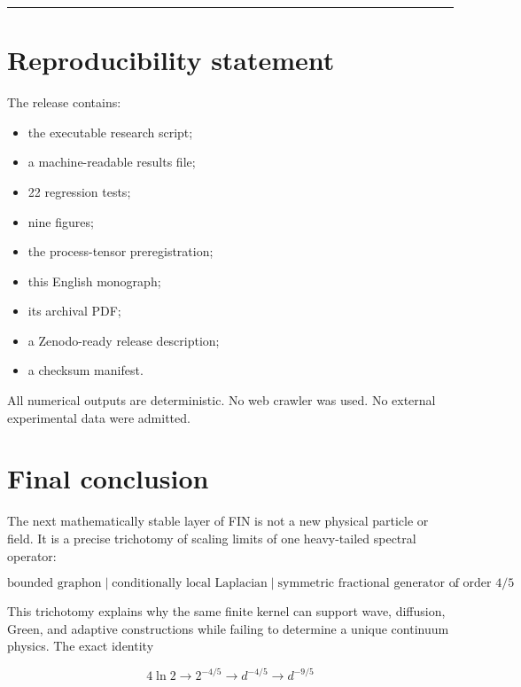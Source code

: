 \documentclass[11pt,a4paper,openany]{report}
\begin{document}
\par\medskip\hrule\medskip

\chapter{Reproducibility statement}

The release contains:

\begin{itemize}
\item 
the executable research script;

\item 
a machine-readable results file;

\item 
22 regression tests;

\item 
nine figures;

\item 
the process-tensor preregistration;

\item 
this English monograph;

\item 
its archival PDF;

\item 
a Zenodo-ready release description;

\item 
a checksum manifest.

\end{itemize}

All numerical outputs are deterministic. No web crawler was used. No external experimental data were admitted.

\chapter{Final conclusion}

The next mathematically stable layer of FIN is not a new physical particle or field. It is a precise trichotomy of scaling limits of one heavy-tailed spectral operator:

\[
\boxed{
\text{bounded graphon}
\;\big|\;
\text{conditionally local Laplacian}
\;\big|\;
\text{symmetric fractional generator of order }4/5
}.
\]

This trichotomy explains why the same finite kernel can support wave, diffusion, Green, and adaptive constructions while failing to determine a unique continuum physics. The exact identity

\[
4\ln2
\longrightarrow
2^{-4/5}
\longrightarrow
d^{-4/5}
\longrightarrow
d^{-9/5}
\]
\end{document}

